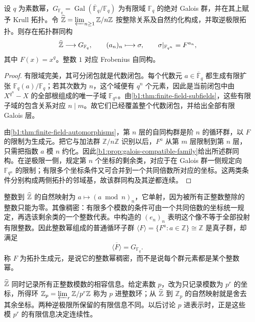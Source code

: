 \begin{theorem}\label{b1:thm:finite-field-absolute-galois}
	设 \(q\) 为素数幂，\(G_{\mathbb F_q}=\operatorname{Gal}(\overline{\mathbb F}_q/\mathbb F_q)\) 为有限域 \(\mathbb F_q\) 的绝对 Galois 群，并在其上赋予 Krull 拓扑。令 \(\widehat{\vphantom{Z}\mathbb Z}=\varprojlim_{n\geq1}\mathbb Z/n\mathbb Z\) 按整除关系及自然约化构成，并取逆极限拓扑。则存在拓扑群同构
	\[
		\widehat{\vphantom{Z}\mathbb Z}\longrightarrow G_{\mathbb F_q}, \qquad(a_n)_n\longmapsto\sigma, \qquad \sigma|_{\mathbb F_{q^n}}=F^{a_n},
	\]
	其中 \(F(x)=x^q\)。整数 \(1\) 对应 Frobenius 自同构。
\end{theorem}
\begin{proof}
	有限域完美，其可分闭包就是代数闭包。每个代数元 \(a\in\overline{\mathbb F}_q\) 都生成有限扩张 \(\mathbb F_q(a)/\mathbb F_q\)；若其次数为 \(n\)，这个域便有 \(q^n\) 个元素，因此是当前闭包中由 \(X^{q^n}-X\) 的全部根组成的唯一子域 \(\mathbb F_{q^n}\)。由\cref{b1:thm:finite-field-subfields}，这些有限子域的包含关系对应 \(n\mid m\)。故它们已经覆盖整个代数闭包，并给出全部有限 Galois 层。

	由\cref{b1:thm:finite-field-automorphisms}，第 \(n\) 层的自同构群是阶 \(n\) 的循环群，以 \(F\) 的限制为生成元。把它与加法群 \(\mathbb Z/n\mathbb Z\) 识别以后，\(F^a\) 从第 \(m\) 层限制到第 \(n\) 层，只需把指数 \(a\) 模 \(n\) 约化。因此\cref{b1:prop:galois-compatible-family}给出所述群同构。在逆极限一侧，规定第 \(n\) 个坐标的剩余类，对应于在 Galois 群一侧规定向 \(\mathbb F_{q^n}\) 的限制；有限多个坐标条件又可合并到一个共同倍数所对应的坐标。这两类条件分别构成两侧拓扑的邻域基，故该群同构及其逆都连续。
\end{proof}
整数到 \(\widehat{\vphantom{Z}\mathbb Z}\) 的自然映射为 \(a\mapsto(a\bmod n)_n\)，它单射，因为被所有正整数整除的整数只能为零。其像稠密：有限多个模数的条件可由一个共同倍数的坐标统一规定，再选该剩余类的一个整数代表。中构造的 \((e_n)_n\) 表明这个像不等于全部投射有限整数。因此整数幂组成的普通循环子群 \(\langle F\rangle=\{F^a:a\in\mathbb Z\}\cong\mathbb Z\) 是真子群，却满足
\[
	\overline{\langle F\rangle}=G_{\mathbb F_q}.
\]
称 \(F\) 为拓扑生成元，是说它的整数幂稠密，而不是说每个群元素都是某个整数幂。

\ProseParagraphBreak
\(\widehat{\vphantom{Z}\mathbb Z}\) 同时记录所有正整数模数的相容信息。给定素数 \(p\)，改为只记录模数为 \(p^r\) 的坐标，所得环 \(\mathbb Z_p=\varprojlim_r\mathbb Z/p^r\mathbb Z\) 称为 \(p\) 进整数环；从 \(\widehat{\vphantom{Z}\mathbb Z}\) 到 \(\mathbb Z_p\) 的自然映射就是舍去其余坐标。两种逆极限所保留的有限信息不同。以后讨论 \(p\) 进表示时，正是这些模 \(p^r\) 的有限信息决定连续性。

